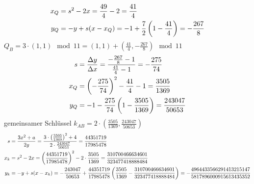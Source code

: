 \documentclass{article}
\begin{document}
\begin{enumerate}[label=(\alph*)]
\begin{align}
			x_Q &= s^2 - 2x = \frac{49}{4} - 2 = \frac{41}{4} \notag \\
			y_Q &= -y + s(x - x_Q) = -1 + \frac{7}{2}\left(1 - \frac{41}{4}\right) = -\frac{267}{8} \notag
		\end{align}
		$Q_B = 3\cdot (1,1) \mod 11 = (1,1) + \left(\frac{41}{4},-\frac{267}{8}\right)\mod 11$
		\begin{align}
			s &= \frac{\Delta y}{\Delta x} = \frac{-\frac{267}{8} - 1}{\frac{41}{4} - 1} = -\frac{275}{74} \notag \\
			x_Q &= \left(-\frac{275}{74}\right)^2 - \frac{41}{4} - 1 = \frac{3505}{1369} \notag \\
			y_Q &= -1 - \frac{275}{74}\left(1 - \frac{3505}{1369}\right) = \frac{243047}{50653} \notag
		\end{align}
		gemeinsamer Schlüssel $k_{AB} = 2\cdot \left(\frac{3505}{1369},\frac{243047}{50653}\right)$
		\begin{align}
			s &= \frac{3x^2 + a}{2y} = \frac{3\cdot \left(\frac{3505}{1369}\right)^2 + 4}{2\cdot \frac{243047}{50653}} = \frac{44351719}{17985478} \notag \\
			x_k &= s^2 - 2x = \left(\frac{44351719}{17985478}\right)^2 - 2\cdot \frac{3505}{1369} = \frac{310700466634601}{323477418888484} \notag \\
			y_k &= -y + s(x - x_k) = -\frac{243047}{50653} + \frac{44351719}{17985478}\left(\frac{3505}{1369} - \frac{310700466634601}{323477418888484}\right) = -\frac{4964433566291413215147}{5817896000915613435352} \notag
		\end{align}
	\end{enumerate}
\end{document}
